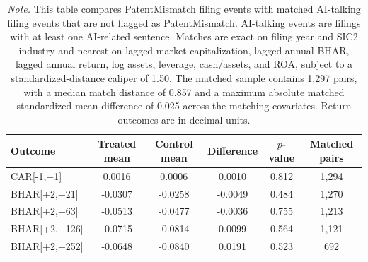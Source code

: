 \begin{table}[p]
\centering
\small
\caption{Matched AI-talking comparison sample}
\label{tab:appendix_matched_ai_talking}
\begin{tabular}{lccccc}
\hline
Outcome & Treated mean & Control mean & Difference & $p$-value & Matched pairs \\
\hline
CAR[-1,+1] & 0.0016 & 0.0006 & 0.0010 & 0.812 & 1,294 \\
BHAR[+2,+21] & -0.0307 & -0.0258 & -0.0049 & 0.484 & 1,270 \\
BHAR[+2,+63] & -0.0513 & -0.0477 & -0.0036 & 0.755 & 1,213 \\
BHAR[+2,+126] & -0.0715 & -0.0814 & 0.0099 & 0.564 & 1,121 \\
BHAR[+2,+252] & -0.0648 & -0.0840 & 0.0191 & 0.523 & 692 \\
\hline
\end{tabular}
\caption*{\footnotesize \textit{Note.} This table compares PatentMismatch filing events with matched AI-talking filing events that are not flagged as PatentMismatch. AI-talking events are filings with at least one AI-related sentence. Matches are exact on filing year and SIC2 industry and nearest on lagged market capitalization, lagged annual BHAR, lagged annual return, log assets, leverage, cash/assets, and ROA, subject to a standardized-distance caliper of 1.50. The matched sample contains 1,297 pairs, with a median match distance of 0.857 and a maximum absolute matched standardized mean difference of 0.025 across the matching covariates. Return outcomes are in decimal units.}
\end{table}
